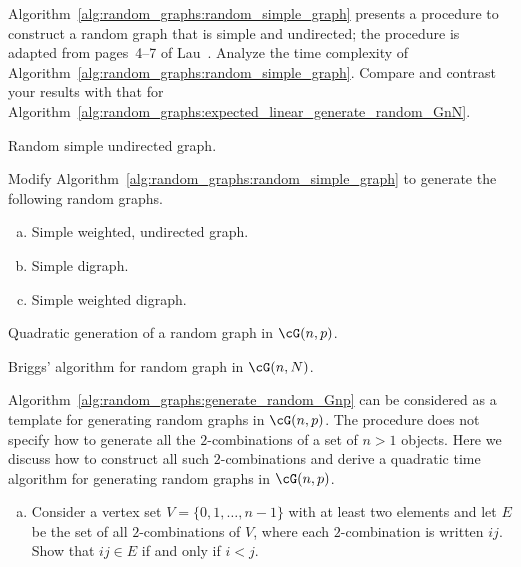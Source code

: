 \begin{problem}
\item Algorithm~\ref{alg:random_graphs:random_simple_graph} presents a
  procedure to construct a random graph that is simple and undirected;
  the procedure is adapted from pages~4--7 of
  Lau~\cite{Lau2007}. Analyze the time complexity of
  Algorithm~\ref{alg:random_graphs:random_simple_graph}. Compare and
  contrast your results with that for
  Algorithm~\ref{alg:random_graphs:expected_linear_generate_random_GnN}.

\begin{algorithm}[!htbp]

\caption{Random simple undirected graph.}
\label{alg:random_graphs:random_simple_graph}
\end{algorithm}

\item Modify Algorithm~\ref{alg:random_graphs:random_simple_graph} to
  generate the following random graphs.
  \begin{enumerate}[(a)]
  \item Simple weighted, undirected graph.

  \item Simple digraph.

  \item Simple weighted digraph.
  \end{enumerate}

\begin{algorithm}[!htbp]

\caption{Quadratic generation of a random graph in $\cG(n,p)$.}
\label{alg:random_graphs:quadratic_generate_random_Gnp}
\end{algorithm}

\begin{algorithm}[!htbp]

\caption{Briggs' algorithm for random graph in $\cG(n,N)$.}
\label{alg:random_graphs:Briggs_random_GnN}
\end{algorithm}

\item\label{prob:random_graphs:quadratic_generate_random_Gnp}
  Algorithm~\ref{alg:random_graphs:generate_random_Gnp} can be
  considered as a template for generating random graphs in
  $\cG(n,p)$. The procedure does not specify how to generate all the
  $2$-combinations of a set of $n > 1$ objects. Here we discuss how to
  construct all such $2$-combinations and derive a quadratic time
  algorithm for generating random graphs in $\cG(n,p)$.
  \begin{enumerate}[(a)]
  \item Consider a vertex set $V = \{0, 1, \dots, n - 1\}$ with at
    least two elements and let $E$ be the set of all $2$-combinations
    of $V$, where each $2$-combination is written $ij$. Show that
    $ij \in E$ if and only if $i < j$.


\end{enumerate}
\end{problem}

